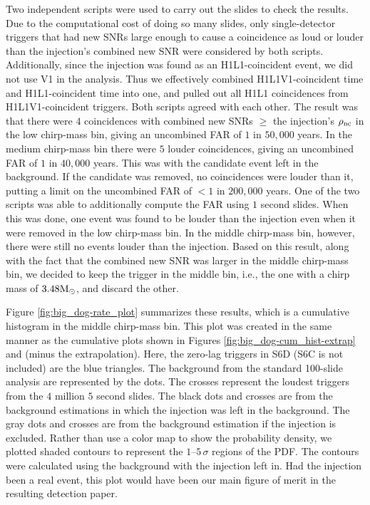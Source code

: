 Two independent scripts were used to carry out the slides to check the results.
Due to the computational cost of doing so many slides, only single-detector
triggers that had new \acp{SNR} large enough to cause a coincidence as loud or
louder than the injection's combined new \ac{SNR} were considered by both
scripts. Additionally, since the injection was found as an H1L1-coincident
event, we did not use V1 in the analysis. Thus we effectively combined
H1L1V1-coincident time and H1L1-coincident time into one, and pulled out all
H1L1 coincidences from H1L1V1-coincident triggers. Both scripts agreed with
each other. The result was that there were $4$ coincidences with combined new
\acp{SNR} $\geq$ the injection's $\rho_{\mathrm{nc}}$ in the low chirp-mass bin, giving
an uncombined \ac{FAR} of $1$ in $50,000$ years. In the medium chirp-mass bin
there were $5$ louder coincidences, giving an uncombined \ac{FAR} of $1$ in
$40,000$ years. This was with the candidate event left in the background. If
the candidate was removed, no coincidences were louder than it, putting a limit
on the uncombined \ac{FAR} of $< 1$ in $200,000$ years. One of the two scripts
was able to additionally compute the \ac{FAR} using $1$ second slides. When
this was done, one event was found to be louder than the injection even when it
were removed in the low chirp-mass bin.  In the middle chirp-mass bin, however,
there were still no events louder than the injection. Based on this result,
along with the fact that the combined new \ac{SNR} was larger in the middle
chirp-mass bin, we decided to keep the trigger in the middle bin, i.e., the one
with a chirp mass of $3.48\mathrm{M_\odot}$, and discard the other.

Figure \ref{fig:big_dog-rate_plot} summarizes these results, which is a
cumulative histogram in the middle chirp-mass bin. This plot was created in the
same manner as the cumulative plots shown in Figures
\ref{fig:big_dog-cum_hist-extrap} and (minus the extrapolation). Here, the
zero-lag triggers in S6D (S6C is not included) are the blue triangles. The
background from the standard 100-slide analysis are represented by the dots.
The crosses represent the loudest triggers from the $4$ million $5$ second
slides. The black dots and crosses are from the background estimations in which
the injection was left in the background. The gray dots and crosses are from
the background estimation if the injection is excluded. Rather than use a color
map to show the probability density, we plotted shaded contours to represent
the $1$--$5\,\sigma$ regions of the \ac{PDF}. The contours were calculated
using the background with the injection left in. Had the injection been a real
event, this plot would have been our main figure of merit in the resulting
detection paper.

